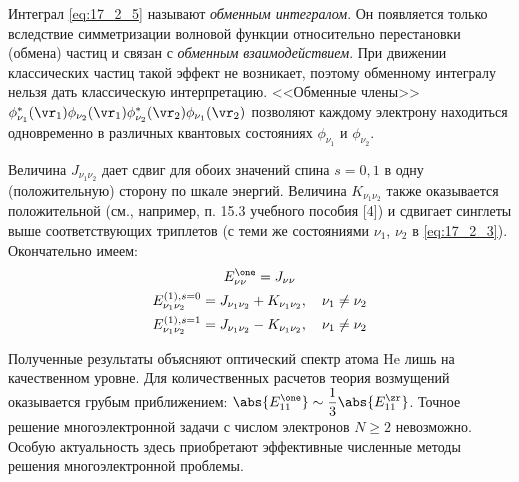 Интеграл \eqref{eq:17_2_5} называют {\em обменным интегралом}. Он появляется только вследствие симметризации волновой функции относительно перестановки (обмена) частиц и связан с {\em обменным взаимодействием}. При движении классических частиц такой эффект не возникает, поэтому обменному интегралу нельзя дать классическую интерпретацию. <<Обменные члены>> $\phi^*_{\nu_1}(\vr_1) \phi_{\nu_2}(\vr_1) \phi^*_{\nu_2}(\vr_2) \phi_{\nu_1}(\vr_2)$ позволяют каждому электрону находиться одновременно в различных квантовых состояниях $\phi_{\nu_1}$ и $\phi_{\nu_2}$.

Величина $J_{\nu_1 \nu_2}$ дает сдвиг для обоих значений спина $s = 0, 1$ в одну (положительную) сторону по шкале энергий. Величина $K_{\nu_1 \nu_2}$ также оказывается положительной (см., например, п. 15.3 учебного пособия [4]) и сдвигает синглеты выше соответствующих триплетов (с теми же состояниями $\nu_1$, $\nu_2$ в \eqref{eq:17_2_3}). Окончательно имеем:
\begin{gather}
\label{eq:17_2_6}
E_{\nu\nu}^\one = J_{\nu\nu} \nonumber \\
E_{\nu_1 \nu_2}^{(1), s=0} = J_{\nu_1\nu_2} + K_{\nu_1\nu_2},~~~\nu_1 \neq \nu_2 \nonumber \\
E_{\nu_1 \nu_2}^{(1), s=1} = J_{\nu_1\nu_2} - K_{\nu_1\nu_2},~~~\nu_1 \neq \nu_2
\end{gather}

Полученные результаты объясняют оптический спектр атома He лишь на качественном уровне. Для количественных расчетов теория возмущений оказывается грубым приближением: $\abs{E_{11}^\one} \sim \dfrac{1}{3} \abs{E_{11}^\zr}$. Точное решение многоэлектронной задачи с числом электронов $N \ge 2$ невозможно. Особую актуальность здесь приобретают эффективные численные методы решения многоэлектронной проблемы.